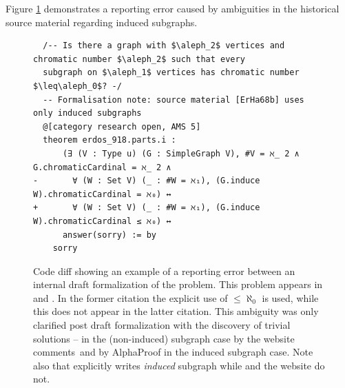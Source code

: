 Figure \ref{fig:misform_reporting_erdos918} demonstrates a reporting error caused by ambiguities in the historical source material regarding induced subgraphs.

\begin{figure}[H]
    \centering
    \begin{verbatim}
  /-- Is there a graph with $\aleph_2$ vertices and chromatic number $\aleph_2$ such that every
  subgraph on $\aleph_1$ vertices has chromatic number $\leq\aleph_0$? -/
  -- Formalisation note: source material [ErHa68b] uses only induced subgraphs
  @[category research open, AMS 5]
  theorem erdos_918.parts.i :
      (∃ (V : Type u) (G : SimpleGraph V), #V = ℵ_ 2 ∧ G.chromaticCardinal = ℵ_ 2 ∧
-       ∀ (W : Set V) (_ : #W = ℵ₁), (G.induce W).chromaticCardinal = ℵ₀) ↔
+       ∀ (W : Set V) (_ : #W = ℵ₁), (G.induce W).chromaticCardinal ≤ ℵ₀) ↔
      answer(sorry) := by
    sorry
    \end{verbatim}
    \caption{Code diff showing an example of a reporting error between an internal draft formalization of the problem. This problem appears in \cite{EH68} and \cite{Erdos69}. In the former citation the explicit use of $\leq \aleph_0$ is used, while this does not appear in the latter citation. This ambiguity was only clarified post draft formalization with the discovery of trivial solutions -- in the (non-induced) subgraph case by the website comments\protect\footnotemark\ and by AlphaProof in the induced subgraph case. Note also that \cite{EH68} explicitly writes \emph{induced} subgraph while \cite{Erdos69} and the website do not.}
    \label{fig:misform_reporting_erdos918}
\end{figure}
